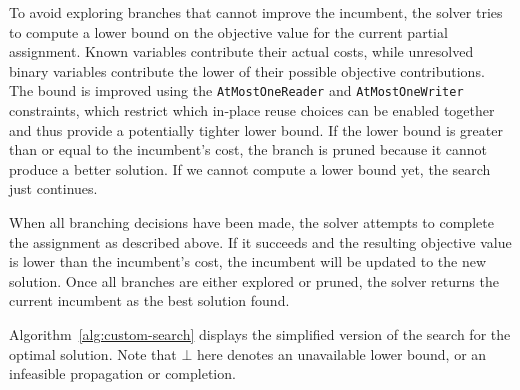 To avoid exploring branches that cannot improve the incumbent, the solver tries to compute a lower bound on the objective value for the current partial assignment.
Known variables contribute their actual costs, while unresolved binary variables contribute the lower of their possible objective contributions.
The bound is improved using the \texttt{AtMostOneReader} and \texttt{AtMostOneWriter} constraints, which restrict which in-place reuse choices can be enabled together and thus provide a potentially tighter lower bound.
If the lower bound is greater than or equal to the incumbent's cost, the branch is pruned because it cannot produce a better solution.
If we cannot compute a lower bound yet, the search just continues.

When all branching decisions have been made, the solver attempts to complete the assignment as described above.
If it succeeds and the resulting objective value is lower than the incumbent's cost, the incumbent will be updated to the new solution.
Once all branches are either explored or pruned, the solver returns the current incumbent as the best solution found.

Algorithm~\ref{alg:custom-search} displays the simplified version of the search for the optimal solution.
Note that $\bot$ here denotes an unavailable lower bound, or an infeasible propagation or completion.

